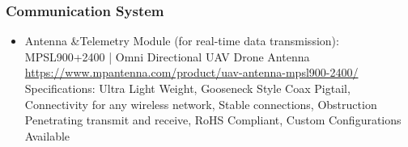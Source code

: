 \subsubsection{Communication System}
\begin{itemize}
    \item Antenna \&Telemetry Module (for real-time data transmission):\\
     MPSL900+2400 | Omni Directional UAV Drone Antenna\\
\href{https://www.mpantenna.com/product/uav-antenna-mpsl900-2400/ }{https://www.mpantenna.com/product/uav-antenna-mpsl900-2400/ }\\
Specifications: Ultra Light Weight, Gooseneck Style Coax Pigtail, Connectivity for any wireless network, Stable connections, Obstruction Penetrating transmit and receive, RoHS Compliant, Custom Configurations Available
\end{itemize}
